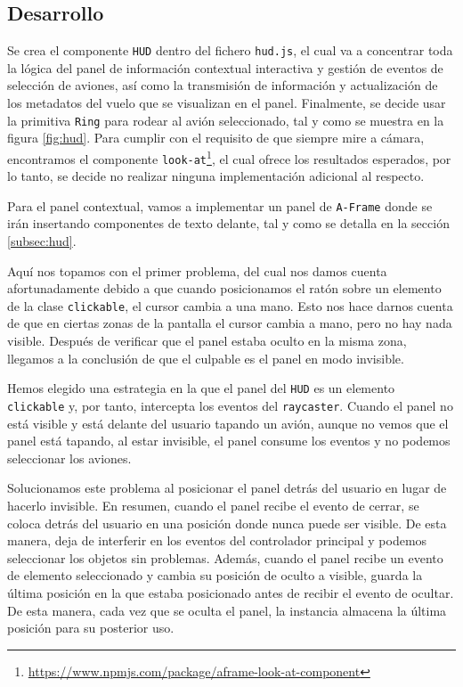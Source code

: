 \documentclass[a4paper, 11pt]{book}
\begin{document}
\subsection{Desarrollo}
Se crea el componente \texttt{HUD} dentro del fichero \texttt{hud.js}, el cual va a concentrar toda la lógica del panel de información contextual interactiva y gestión de eventos de selección de aviones, así como la transmisión de información y actualización de los metadatos del vuelo que se visualizan en el panel. Finalmente, se decide usar la primitiva \texttt{Ring} para rodear al avión seleccionado, tal y como se muestra en la figura \ref{fig:hud}. Para cumplir con el requisito de que siempre mire a cámara, encontramos el componente \texttt{look-at}\footnote{\url{https://www.npmjs.com/package/aframe-look-at-component}}, el cual ofrece los resultados esperados, por lo tanto, se decide no realizar ninguna implementación adicional al respecto.

Para el panel contextual, vamos a implementar un panel de \texttt{A-Frame} donde se irán insertando componentes de texto delante, tal y como se detalla en la sección \ref{subsec:hud}. 

Aquí nos topamos con el primer problema, del cual nos damos cuenta afortunadamente debido a que cuando posicionamos el ratón sobre un elemento de la clase \texttt{clickable}, el cursor cambia a una mano. Esto nos hace darnos cuenta de que en ciertas zonas de la pantalla el cursor cambia a mano, pero no hay nada visible. Después de verificar que el panel estaba oculto en la misma zona, llegamos a la conclusión de que el culpable es el panel en modo invisible.

Hemos elegido una estrategia en la que el panel del \texttt{HUD} es un elemento \texttt{clickable} y, por tanto, intercepta los eventos del \texttt{raycaster}. Cuando el panel no está visible y está delante del usuario tapando un avión, aunque no vemos que el panel está tapando, al estar invisible, el panel consume los eventos y no podemos seleccionar los aviones.

Solucionamos este problema al posicionar el panel detrás del usuario en lugar de hacerlo invisible. En resumen, cuando el panel recibe el evento de cerrar, se coloca detrás del usuario en una posición donde nunca puede ser visible. De esta manera, deja de interferir en los eventos del controlador principal y podemos seleccionar los objetos sin problemas.
Además, cuando el panel recibe un evento de elemento seleccionado y cambia su posición de oculto a visible, guarda la última posición en la que estaba posicionado antes de recibir el evento de ocultar. De esta manera, cada vez que se oculta el panel, la instancia almacena la última posición para su posterior uso.
\end{document}
